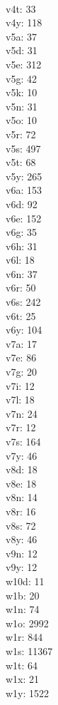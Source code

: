\begin{multicols}{8}
  \\v4t: 33
  \\v4y: 118
  \\v5a: 37
  \\v5d: 31
  \\v5e: 312
  \\v5g: 42
  \\v5k: 10
  \\v5n: 31
  \\v5o: 10
  \\v5r: 72
  \\v5s: 497
  \\v5t: 68
  \\v5y: 265
  \\v6a: 153
  \\v6d: 92
  \\v6e: 152
  \\v6g: 35
  \\v6h: 31
  \\v6l: 18
  \\v6n: 37
  \\v6r: 50
  \\v6s: 242
  \\v6t: 25
  \\v6y: 104
  \\v7a: 17
  \\v7e: 86
  \\v7g: 20
  \\v7i: 12
  \\v7l: 18
  \\v7n: 24
  \\v7r: 12
  \\v7s: 164
  \\v7y: 46
  \\v8d: 18
  \\v8e: 18
  \\v8n: 14
  \\v8r: 16
  \\v8s: 72
  \\v8y: 46
  \\v9n: 12
  \\v9y: 12
  \\w10d: 11
  \\w1b: 20
  \\w1n: 74
  \\w1o: 2992
  \\w1r: 844
  \\w1s: 11367
  \\w1t: 64
  \\w1x: 21
  \\w1y: 1522

\end{multicols}
